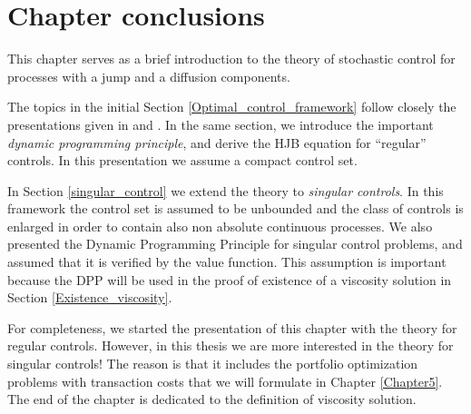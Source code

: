 \section{Chapter conclusions}


This chapter serves as a brief introduction to the theory of stochastic control for processes with a jump and a diffusion components. 

The topics in the initial Section \ref{Optimal_control_framework} follow closely the presentations given in \cite{Skorohod} and \cite{Ph98}.
In the same section, we introduce the important \emph{dynamic programming principle}, and derive the HJB equation for ``regular'' controls.
In this presentation we assume a compact control set.

In Section \ref{singular_control} we extend the theory to \emph{singular controls}. 
In this framework the control set is assumed to be unbounded and the class of controls is enlarged in order to contain also non absolute continuous processes.
We also presented the Dynamic Programming Principle for singular control problems, and assumed that it is verified by the value function. 
This assumption is important because the DPP will be used in the proof of existence of a viscosity solution in Section \ref{Existence_viscosity}.

For completeness, we started the presentation of this chapter with the theory for regular controls. 
However, in this thesis we are more interested in the theory for singular controls! The reason is that it includes the portfolio optimization problems with transaction costs 
that we will formulate in Chapter \ref{Chapter5}.\\
The end of the chapter is dedicated to the definition of viscosity solution.



% 
   


